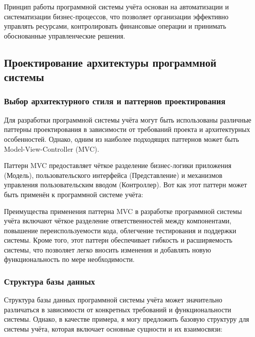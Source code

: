 Принцип работы программной системы учёта основан на автоматизации и систематизации бизнес-процессов, что позволяет организации эффективно управлять ресурсами, контролировать финансовые операции и принимать обоснованные управленческие решения.


\subsection{Проектирование архитектуры программной системы}
\subsubsection{Выбор архитектурного стиля и паттернов проектирования}
Для разработки программной системы учёта могут быть использованы различные паттерны проектирования в зависимости от требований проекта и архитектурных особенностей. Однако, одним из наиболее подходящих паттернов может быть Model-View-Controller (MVC).

Паттерн MVC предоставляет чёткое разделение бизнес-логики приложения (Модель), пользовательского интерфейса (Представление) и механизмов управления пользовательским вводом (Контроллер). Вот как этот паттерн может быть применён к программной системе учёта:

Преимущества применения паттерна MVC в разработке программной системы учёта включают чёткое разделение ответственностей между компонентами, повышение переиспользуемости кода, облегчение тестирования и поддержки системы. Кроме того, этот паттерн обеспечивает гибкость и расширяемость системы, что позволяет легко вносить изменения и добавлять новую функциональность по мере необходимости.

\subsubsection{Структура базы данных}

Структура базы данных программной системы учёта может значительно различаться в зависимости от конкретных требований и функциональности системы. Однако, в качестве примера, я могу предложить базовую структуру для системы учёта, которая включает основные сущности и их взаимосвязи:

